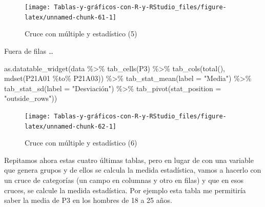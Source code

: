 \documentclass[
]{book}
\newenvironment{Shaded}{\begin{snugshade}}{\end{snugshade}}
\newcommand{\AttributeTok}[1]{\textcolor[rgb]{0.77,0.63,0.00}{#1}}
\newcommand{\FunctionTok}[1]{\textcolor[rgb]{0.00,0.00,0.00}{#1}}
\newcommand{\NormalTok}[1]{#1}
\newcommand{\SpecialCharTok}[1]{\textcolor[rgb]{0.00,0.00,0.00}{#1}}
\newcommand{\StringTok}[1]{\textcolor[rgb]{0.31,0.60,0.02}{#1}}
\begin{document}
\begin{figure}[H]

{\centering \texttt{[image: Tablas-y-gráficos-con-R-y-RStudio\_files/figure-latex/unnamed-chunk-61-1]} 

}

\caption{Cruce con múltiple y estadístico (5)}\label{fig:unnamed-chunk-61}
\end{figure}

Fuera de filas \ldots{}

\begin{Shaded}
\begin{Highlighting}[]
\FunctionTok{as.datatable\_widget}\NormalTok{(data }\SpecialCharTok{\%\textgreater{}\%} \FunctionTok{tab\_cells}\NormalTok{(P3) }\SpecialCharTok{\%\textgreater{}\%} \FunctionTok{tab\_cols}\NormalTok{(}\FunctionTok{total}\NormalTok{(), }
  \FunctionTok{mdset}\NormalTok{(P21A01 }\SpecialCharTok{\%to\%}\NormalTok{ P21A03)) }\SpecialCharTok{\%\textgreater{}\%} \FunctionTok{tab\_stat\_mean}\NormalTok{(}\AttributeTok{label =} \StringTok{"Media"}\NormalTok{) }\SpecialCharTok{\%\textgreater{}\%} 
  \FunctionTok{tab\_stat\_sd}\NormalTok{(}\AttributeTok{label =} \StringTok{"Desviación"}\NormalTok{) }\SpecialCharTok{\%\textgreater{}\%} \FunctionTok{tab\_pivot}\NormalTok{(}\AttributeTok{stat\_position =} \StringTok{"outside\_rows"}\NormalTok{))}
\end{Highlighting}
\end{Shaded}

\begin{figure}[H]

{\centering \texttt{[image: Tablas-y-gráficos-con-R-y-RStudio\_files/figure-latex/unnamed-chunk-62-1]} 

}

\caption{Cruce con múltiple y estadístico (6)}\label{fig:unnamed-chunk-62}
\end{figure}

Repitamos ahora estas cuatro últimas tablas, pero en lugar de con una variable que genera grupos y de ellos se calcula la medida estadística, vamos a hacerlo con un cruce de categorías (un campo en columnas y otro en filas) y que en esos cruces, se calcule la medida estadística. Por ejemplo esta tabla me permitiría saber la media de P3 en los hombres de 18 a 25 años.
\end{document}
